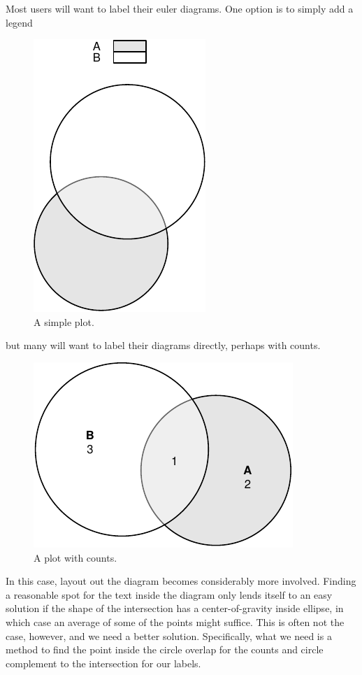 \documentclass[
  headsepline=true,headings=standardclasses%
]{scrartcl}
\theoremstyle{definition}
\theoremstyle{definition}
\theoremstyle{definition}
\theoremstyle{remark}
\begin{document}
Most users will want to label their euler diagrams. One option is to
simply add a legend

\begin{figure}
\centering
\includegraphics{thesis_files/figure-latex/unnamed-chunk-5-1.pdf}
\caption{\label{fig:unnamed-chunk-5}A simple plot.}
\end{figure}

but many will want to label their diagrams directly, perhaps with
counts.

\begin{figure}
\centering
\includegraphics{thesis_files/figure-latex/unnamed-chunk-6-1.pdf}
\caption{\label{fig:unnamed-chunk-6}A plot with counts.}
\end{figure}

In this case, layout out the diagram becomes considerably more involved.
Finding a reasonable spot for the text inside the diagram only lends
itself to an easy solution if the shape of the intersection has a
center-of-gravity inside ellipse, in which case an average of some of
the points might suffice. This is often not the case, however, and we
need a better solution. Specifically, what we need is a method to find
the point inside the circle overlap for the counts and circle complement
to the intersection for our labels.
\end{document}

